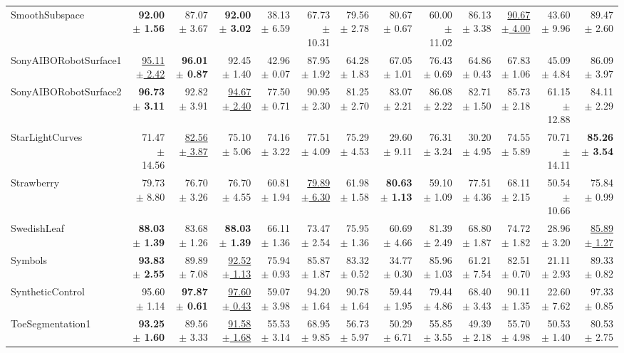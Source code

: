 \begin{landscape}
\begin{longtable}{lrrrrrrrrrrrr}
SmoothSubspace & \textbf{92.00 $\pm$ 1.56} & 87.07 $\pm$ 3.67 & \textbf{92.00 $\pm$ 3.02} & 38.13 $\pm$ 6.59 & 67.73 $\pm$ 10.31 & 79.56 $\pm$ 2.78 & 80.67 $\pm$ 0.67 & 60.00 $\pm$ 11.02 & 86.13 $\pm$ 3.38 & \underline{90.67 $\pm$ 4.00} & 43.60 $\pm$ 9.96 & 89.47 $\pm$ 2.60 \\
SonyAIBORobotSurface1 & \underline{95.11 $\pm$ 2.42} & \textbf{96.01 $\pm$ 0.87} & 92.45 $\pm$ 1.40 & 42.96 $\pm$ 0.07 & 87.95 $\pm$ 1.92 & 64.28 $\pm$ 1.83 & 67.05 $\pm$ 1.01 & 76.43 $\pm$ 0.69 & 64.86 $\pm$ 0.43 & 67.83 $\pm$ 1.06 & 45.09 $\pm$ 4.84 & 86.09 $\pm$ 3.97 \\
SonyAIBORobotSurface2 & \textbf{96.73 $\pm$ 3.11} & 92.82 $\pm$ 3.91 & \underline{94.67 $\pm$ 2.40} & 77.50 $\pm$ 0.71 & 90.95 $\pm$ 2.30 & 81.25 $\pm$ 2.70 & 83.07 $\pm$ 2.21 & 86.08 $\pm$ 2.22 & 82.71 $\pm$ 1.50 & 85.73 $\pm$ 2.18 & 61.15 $\pm$ 12.88 & 84.11 $\pm$ 2.29 \\
StarLightCurves & 71.47 $\pm$ 14.56 & \underline{82.56 $\pm$ 3.87} & 75.10 $\pm$ 5.06 & 74.16 $\pm$ 3.22 & 77.51 $\pm$ 4.09 & 75.29 $\pm$ 4.53 & 29.60 $\pm$ 9.11 & 76.31 $\pm$ 3.24 & 30.20 $\pm$ 4.95 & 74.55 $\pm$ 5.89 & 70.71 $\pm$ 14.11 & \textbf{85.26 $\pm$ 3.54} \\
Strawberry & 79.73 $\pm$ 8.80 & 76.70 $\pm$ 3.26 & 76.70 $\pm$ 4.55 & 60.81 $\pm$ 1.94 & \underline{79.89 $\pm$ 6.30} & 61.98 $\pm$ 1.58 & \textbf{80.63 $\pm$ 1.13} & 59.10 $\pm$ 1.09 & 77.51 $\pm$ 4.36 & 68.11 $\pm$ 2.15 & 50.54 $\pm$ 10.66 & 75.84 $\pm$ 0.99 \\
SwedishLeaf & \textbf{88.03 $\pm$ 1.39} & 83.68 $\pm$ 1.26 & \textbf{88.03 $\pm$ 1.39} & 66.11 $\pm$ 1.36 & 73.47 $\pm$ 2.54 & 75.95 $\pm$ 1.36 & 60.69 $\pm$ 4.66 & 81.39 $\pm$ 2.49 & 68.80 $\pm$ 1.87 & 74.72 $\pm$ 1.82 & 28.96 $\pm$ 3.20 & \underline{85.89 $\pm$ 1.27} \\
Symbols & \textbf{93.83 $\pm$ 2.55} & 89.89 $\pm$ 7.08 & \underline{92.52 $\pm$ 1.13} & 75.94 $\pm$ 0.93 & 85.87 $\pm$ 1.87 & 83.32 $\pm$ 0.52 & 34.77 $\pm$ 0.30 & 85.96 $\pm$ 1.03 & 61.21 $\pm$ 7.54 & 82.51 $\pm$ 0.70 & 21.11 $\pm$ 2.93 & 89.33 $\pm$ 0.82 \\
SyntheticControl & 95.60 $\pm$ 1.14 & \textbf{97.87 $\pm$ 0.61} & \underline{97.60 $\pm$ 0.43} & 59.07 $\pm$ 3.98 & 94.20 $\pm$ 1.64 & 90.78 $\pm$ 1.64 & 59.44 $\pm$ 1.95 & 79.44 $\pm$ 4.86 & 68.40 $\pm$ 3.43 & 90.11 $\pm$ 1.35 & 22.60 $\pm$ 7.62 & 97.33 $\pm$ 0.85 \\
ToeSegmentation1 & \textbf{93.25 $\pm$ 1.60} & 89.56 $\pm$ 3.33 & \underline{91.58 $\pm$ 1.68} & 55.53 $\pm$ 3.14 & 68.95 $\pm$ 9.85 & 56.73 $\pm$ 5.97 & 50.29 $\pm$ 6.71 & 55.85 $\pm$ 3.55 & 49.39 $\pm$ 2.18 & 55.70 $\pm$ 4.98 & 50.53 $\pm$ 1.40 & 80.53 $\pm$ 2.75 \\

\end{longtable}
\end{landscape}

